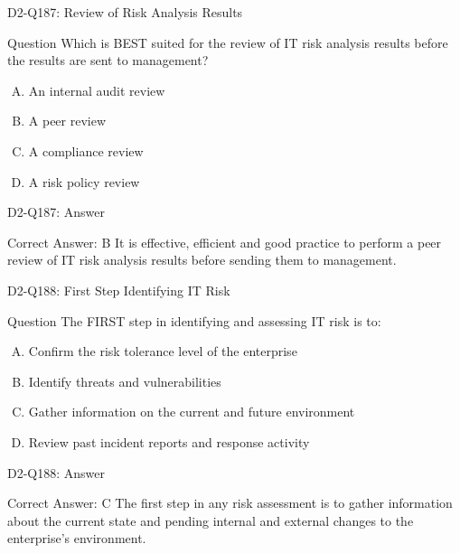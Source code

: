 \documentclass{beamer}
\begin{document}
	\begin{frame}{D2-Q187: Review of Risk Analysis Results}
		\begin{block}{Question}
			Which is BEST suited for the review of IT risk analysis results before the results are sent to management?
		\end{block}
		\begin{enumerate}[(A)]
			\item An internal audit review
			\item A peer review
			\item A compliance review
			\item A risk policy review
		\end{enumerate}
	\end{frame}
	\begin{frame}{D2-Q187: Answer}
		\begin{block}{Correct Answer: B}
			It is effective, efficient and good practice to perform a peer review of IT risk analysis results before sending them to management.
		\end{block}
	\end{frame}
	
	\begin{frame}{D2-Q188: First Step Identifying IT Risk}
		\begin{block}{Question}
			The FIRST step in identifying and assessing IT risk is to:
		\end{block}
		\begin{enumerate}[(A)]
			\item Confirm the risk tolerance level of the enterprise
			\item Identify threats and vulnerabilities
			\item Gather information on the current and future environment
			\item Review past incident reports and response activity
		\end{enumerate}
	\end{frame}
	\begin{frame}{D2-Q188: Answer}
		\begin{block}{Correct Answer: C}
			The first step in any risk assessment is to gather information about the current state and pending internal and external changes to the enterprise's environment.
		\end{block}
	\end{frame}
	
\end{document}
